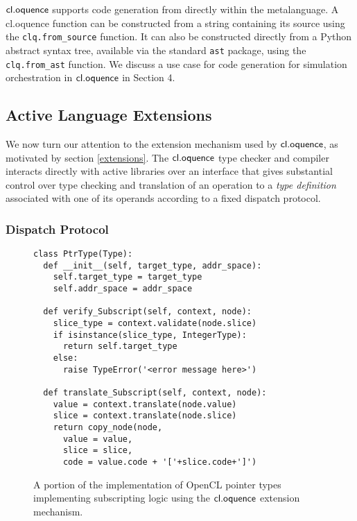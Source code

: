 \documentclass[10pt, conference, compsocconf]{IEEEtran}
\begin{document}
$\textsf{cl.oquence}$ supports code generation from directly within the metalanguage. A cl.oquence function can be constructed from a string containing its source using the \verb|clq.from_source| function. It can also be constructed directly from a Python abstract syntax tree, available via the standard \verb|ast| package, using the \verb|clq.from_ast| function. We discuss a use case for code generation for simulation orchestration in $\textsf{cl.oquence}$ in Section 4.

\subsection{Active Language Extensions}
We now turn our attention to the extension mechanism used by $\textsf{cl.oquence}$, as motivated by section \ref{extensions}. The $\textsf{cl.oquence}$ type checker and compiler interacts directly with active libraries over an interface that gives substantial control over type checking and translation of an operation to a {\it type definition} associated with one of its operands according to a fixed dispatch protocol.

\subsubsection{Dispatch Protocol}
\begin{figure}\small{
\begin{verbatim}
class PtrType(Type):
  def __init__(self, target_type, addr_space):
    self.target_type = target_type
    self.addr_space = addr_space
        
  def verify_Subscript(self, context, node):
    slice_type = context.validate(node.slice)
    if isinstance(slice_type, IntegerType):
      return self.target_type
    else: 
      raise TypeError('<error message here>')
       
  def translate_Subscript(self, context, node):
    value = context.translate(node.value)
    slice = context.translate(node.slice)
    return copy_node(node, 
      value = value,
      slice = slice,    
      code = value.code + '['+slice.code+']')
\end{verbatim}}
\caption{A portion of the implementation of OpenCL pointer types implementing subscripting logic using the $\textsf{cl.oquence}$ extension mechanism.}
\label{pointers}
\end{figure}
\end{document}
